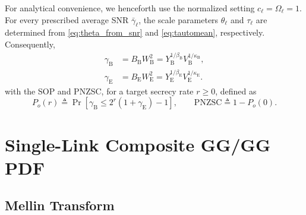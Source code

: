 \documentclass[lettersize,journal]{IEEEtran}
\begin{document}
For analytical convenience, we henceforth use the normalized setting
\(c_\ell=\Omega_\ell=1\). For every prescribed average SNR
\(\bar{\gamma}_\ell\), the scale parameters \(\theta_\ell\) and
\(\tau_\ell\) are determined from \eqref{eq:theta_from_snr} and
\eqref{eq:tautomean}, respectively. Consequently,
\begin{equation}
\begin{aligned}
\gamma_{\mathrm B}
&=B_{\mathrm B}W_{\mathrm B}^2
=Y_{\mathrm B}^{1/\beta_{\mathrm B}}
V_{\mathrm B}^{1/\kappa_{\mathrm B}},\\
\gamma_{\mathrm E}
&=B_{\mathrm E}W_{\mathrm E}^2
=Y_{\mathrm E}^{1/\beta_{\mathrm E}}
V_{\mathrm E}^{1/\kappa_{\mathrm E}}.
\end{aligned}
\label{eq:gammadef}
\end{equation}
with the SOP and PNZSC, for a target secrecy rate \(r\geq0\), defined as
\begin{equation}
P_o(r)\triangleq
\Pr\!\left[
\gamma_{\mathrm B}
\leq 2^r(1+\gamma_{\mathrm E})-1
\right],
\qquad
\mathrm{PNZSC}\triangleq 1-P_o(0).
\label{eq:SOP_PNZSC_def}
\end{equation}


\section{Single-Link Composite GG/GG PDF}
\label{sec:slpdf}

\subsection{Mellin Transform}
\end{document}
